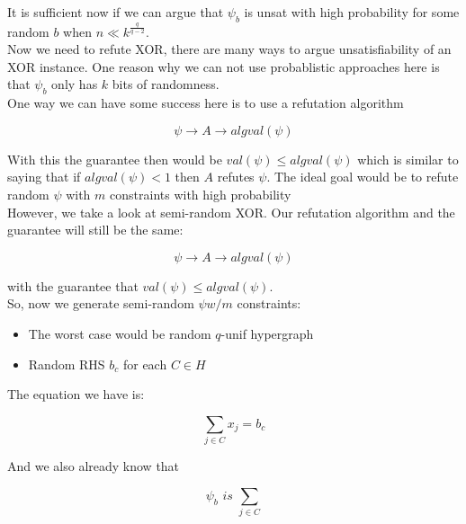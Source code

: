\documentclass{article}
\begin{document}
\noindent It is sufficient now if we can argue that $\psi_b$ is unsat with high probability for some random $b$ when $n \ll k^{\frac{q}{q-2}}$.\\

\noindent Now we need to refute XOR, there are many ways to argue unsatisfiability of an XOR instance. One reason why we can not use probablistic approaches here is that $\psi_b$ only has $k$ bits of randomness.\\

\noindent One way we can have some success here is to use a refutation algorithm

\begin{equation*}
\psi \rightarrow A \rightarrow algval(\psi)
\end{equation*}

\noindent With this the guarantee then would be $val(\psi) \leq algval(\psi)$ which is similar to saying that if $algval(\psi) < 1$ then $A$ refutes $\psi$. The ideal goal would be to refute random $\psi$ with $m$ constraints with high probability\\

\noindent However, we take a look at semi-random XOR. Our refutation algorithm and the guarantee will still be the same:

\begin{equation*}
\psi \rightarrow A \rightarrow algval(\psi)
\end{equation*}

\noindent with the guarantee that $val(\psi) \leq algval(\psi)$.\\

\noindent So, now we generate semi-random $\psi w/ m$ constraints:

\begin{itemize}
    \item The worst case would be random $q$-unif hypergraph
    \item Random RHS $b_c$ for each $C \in H$
\end{itemize}

\noindent The equation we have is:

\begin{equation}
    \sum_{j \in C} x_j = b_c
\end{equation}

\noindent And we also already know that 

\begin{equation*}
    \psi_b \textit{ is } \sum_{j \in C}
\end{equation*}
\end{document}
